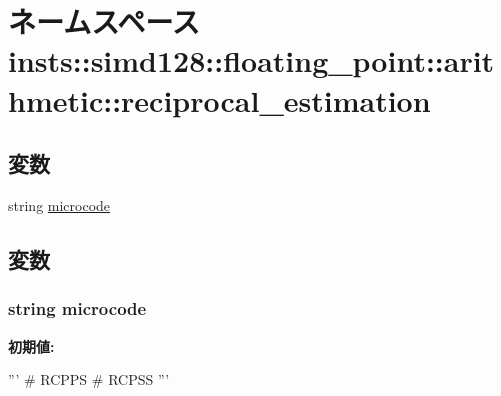\hypertarget{namespaceinsts_1_1simd128_1_1floating__point_1_1arithmetic_1_1reciprocal__estimation}{
\section{ネームスペース insts::simd128::floating\_\-point::arithmetic::reciprocal\_\-estimation}
\label{namespaceinsts_1_1simd128_1_1floating__point_1_1arithmetic_1_1reciprocal__estimation}
}
\subsection*{変数}
\begin{DoxyCompactItemize}
\item 
string \hyperlink{namespaceinsts_1_1simd128_1_1floating__point_1_1arithmetic_1_1reciprocal__estimation_a770f11a173e99389a8802f0107ed8f52}{microcode}
\end{DoxyCompactItemize}


\subsection{変数}
\hypertarget{namespaceinsts_1_1simd128_1_1floating__point_1_1arithmetic_1_1reciprocal__estimation_a770f11a173e99389a8802f0107ed8f52}{
\subsubsection[{microcode}]{\setlength{\rightskip}{0pt plus 5cm}string {\bf microcode}}}
\label{namespaceinsts_1_1simd128_1_1floating__point_1_1arithmetic_1_1reciprocal__estimation_a770f11a173e99389a8802f0107ed8f52}
{\bfseries 初期値:}
\begin{DoxyCode}
'''
# RCPPS
# RCPSS
'''
\end{DoxyCode}
